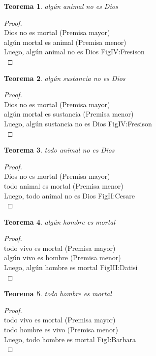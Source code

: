 ﻿\documentclass[12pt]{book}
\newtheorem{theorem}{Teorema}[chapter]
\newtheorem{proof}{Demostración}
\begin{document}
\begin{theorem}
algún animal no es Dios
\label{th: 57}
\end{theorem}\begin{proof}\\Dios no es mortal	 (Premisa mayor) \\algún mortal es animal	 (Premisa menor) \\Luego, algún animal no es Dios	FigIV:Fresison \\ \end{proof}
\begin{theorem}
algún sustancia no es Dios
\label{th: 58}
\end{theorem}\begin{proof}\\Dios no es mortal	 (Premisa mayor) \\algún mortal es sustancia	 (Premisa menor) \\Luego, algún sustancia no es Dios	FigIV:Fresison \\ \end{proof}
\begin{theorem}
todo animal no es Dios
\label{th: 59}
\end{theorem}\begin{proof}\\Dios no es mortal	 (Premisa mayor) \\todo animal es mortal	 (Premisa menor) \\Luego, todo animal no es Dios	FigII:Cesare \\ \end{proof}
\begin{theorem}
algún hombre es mortal
\label{th: 60}
\end{theorem}\begin{proof}\\todo vivo es mortal	 (Premisa mayor) \\algún vivo es hombre	 (Premisa menor) \\Luego, algún hombre es mortal	FigIII:Datisi \\ \end{proof}
\begin{theorem}
todo hombre es mortal
\label{th: 61}
\end{theorem}\begin{proof}\\todo vivo es mortal	 (Premisa mayor) \\todo hombre es vivo	 (Premisa menor) \\Luego, todo hombre es mortal	FigI:Barbara \\ \end{proof}
\end{document}
